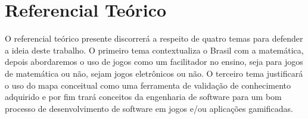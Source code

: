 \chapter[Referencial Teórico]{Referencial Teórico}
O referencial teórico presente discorrerá a respeito de quatro temas para defender a ideia deste trabalho. O primeiro tema contextualiza o Brasil com a matemática, depois abordaremos o uso de jogos como um facilitador no ensino, seja para jogos de matemática ou não, sejam jogos eletrônicos ou não. O terceiro tema justificará o uso do mapa conceitual como uma ferramenta de validação de conhecimento adquirido e por fim trará conceitos da engenharia de software para um bom processo de desenvolvimento de software em jogos e/ou aplicações gamificadas. 







\begin{comment}
Existem estudos com referencial teórico apoiando o uso de gamificação em vários contextos e utilizando dos benefícios oferecidos por ela. Exemplo de contextos como marketing, saúde, educação e etc. A gamificação é também utilizada em contextos de ensino de matemática (embora não sejam muitos os resultados encontrados para universidades). Em alguns casos são utilizados a tecnologia junto da gamificação nos contextos acima citado. É dito que a tecnologia e jogos contribuem para ajudar no engajamento e chamar atenção das pessoas e dos estudantes.
Tem um estudo dizendo que não há limites para a idade de jogar, brincar e se divertir. Por isso jogo e gamificação podem ser possíveis estratégias para utilizar em comunhão de tecnologias visando o ensino de EDO 1ª ordem para estudantes do ensino superior.
 
 \end{comment}
